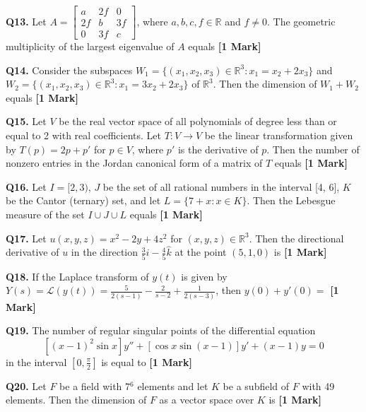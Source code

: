 \documentclass[11pt]{article}
\newcommand{\questiona}[2]{
    \noindent\textbf{Q#2.} #1 \hfill \textbf{[1 Mark]}
}
\begin{document}
\questiona{Let \( A = \begin{bmatrix} a & 2f & 0 \\ 2f & b & 3f \\ 0 & 3f & c \end{bmatrix} \), where \( a, b, c, f \in \mathbb{R} \) and \( f \neq 0 \). The geometric multiplicity of the largest eigenvalue of \( A \) equals}{13}
\vspace{0.5cm}

\questiona{Consider the subspaces \( W_1 = \{(x_1, x_2, x_3) \in \mathbb{R}^3 : x_1 = x_2 + 2x_3\} \) and \( W_2 = \{(x_1, x_2, x_3) \in \mathbb{R}^3 : x_1 = 3x_2 + 2x_3\} \) of \( \mathbb{R}^3 \). Then the dimension of \( W_1 + W_2 \) equals}{14}
\vspace{0.5cm}

\questiona{Let \( V \) be the real vector space of all polynomials of degree less than or equal to 2 with real coefficients. Let \( T : V \to V \) be the linear transformation given by \( T(p) = 2p + p' \) for \( p \in V \), where \( p' \) is the derivative of \( p \). Then the number of nonzero entries in the Jordan canonical form of a matrix of \( T \) equals}{15}
\vspace{0.5cm}

\questiona{Let \( I = [2, 3) \), \( J \) be the set of all rational numbers in the interval [4, 6], \( K \) be the Cantor (ternary) set, and let \( L = \{7 + x : x \in K\} \). Then the Lebesgue measure of the set \( I \cup J \cup L \) equals}{16}
\vspace{0.5cm}

\questiona{Let \( u(x, y, z) = x^2 - 2y + 4z^2 \) for \( (x, y, z) \in \mathbb{R}^3 \). Then the directional derivative of \( u \) in the direction \( \frac{3}{5} \hat{i} - \frac{4}{5} \hat{k} \) at the point \( (5, 1, 0) \) is}{17}
\vspace{0.5cm}

\questiona{If the Laplace transform of \( y(t) \) is given by \( Y(s) = \mathcal{L}(y(t)) = \frac{5}{2(s - 1)} - \frac{2}{s - 2} + \frac{1}{2(s - 3)} \), then \( y(0) + y'(0) = \)}{18}
\vspace{0.5cm}

\questiona{The number of regular singular points of the differential equation \[ [(x - 1)^2 \sin x] y'' + [\cos x \sin(x - 1)] y' + (x - 1) y = 0 \] in the interval \( \left[0, \frac{\pi}{2} \right] \) is equal to}{19}
\vspace{0.5cm}

\questiona{Let \( F \) be a field with 7\(^6\) elements and let \( K \) be a subfield of \( F \) with 49 elements. Then the dimension of \( F \) as a vector space over \( K \) is}{20}
\vspace{0.5cm}
\end{document}
